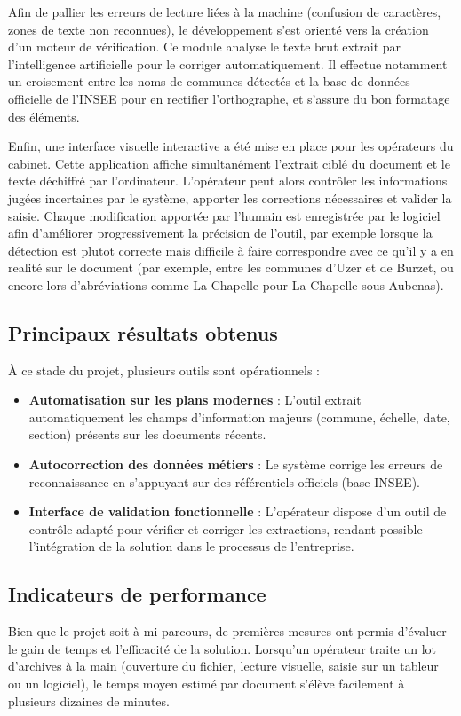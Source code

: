 \documentclass[a4paper,11pt]{article}
\begin{document}
Afin de pallier les erreurs de lecture liées à la machine (confusion de caractères, zones de texte non reconnues), le développement s'est orienté vers la création d'un moteur de vérification. Ce module analyse le texte brut extrait par l'intelligence artificielle pour le corriger automatiquement. Il effectue notamment un croisement entre les noms de communes détectés et la base de données officielle de l'INSEE pour en rectifier l'orthographe, et s'assure du bon formatage des éléments.

Enfin, une interface visuelle interactive a été mise en place pour les opérateurs du cabinet. Cette application affiche simultanément l'extrait ciblé du document et le texte déchiffré par l'ordinateur. L'opérateur peut alors contrôler les informations jugées incertaines par le système, apporter les corrections nécessaires et valider la saisie. Chaque modification apportée par l'humain est enregistrée par le logiciel afin d'améliorer progressivement la précision de l'outil, par exemple lorsque la détection est plutot correcte mais difficile à faire correspondre avec ce qu'il y a en realité sur le document (par exemple, entre les communes d'Uzer et de Burzet, ou encore lors d'abréviations comme La Chapelle pour La Chapelle-sous-Aubenas).

\subsection{Principaux résultats obtenus}
À ce stade du projet, plusieurs outils sont opérationnels :
\begin{itemize}[leftmargin=1.2em]
  \item \textbf{Automatisation sur les plans modernes} : L'outil extrait automatiquement les champs d'information majeurs (commune, échelle, date, section) présents sur les documents récents.
  \item \textbf{Autocorrection des données métiers} : Le système corrige les erreurs de reconnaissance en s'appuyant sur des référentiels officiels (base INSEE).
  \item \textbf{Interface de validation fonctionnelle} : L'opérateur dispose d'un outil de contrôle adapté pour vérifier et corriger les extractions, rendant possible l'intégration de la solution dans le processus de l'entreprise.
\end{itemize}

\subsection{Indicateurs de performance}
Bien que le projet soit à mi-parcours, de premières mesures ont permis d'évaluer le gain de temps et l'efficacité de la solution. Lorsqu'un opérateur traite un lot d'archives à la main (ouverture du fichier, lecture visuelle, saisie sur un tableur ou un logiciel), le temps moyen estimé par document s'élève facilement à plusieurs dizaines de minutes. 
\end{document}
